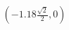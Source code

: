 \documentclass[preview]{standalone}
\begin{document}
\begin{align*}
(-1.18 \frac{ \sqrt{2} }{2}, 0)
\end{align*}
\end{document}
